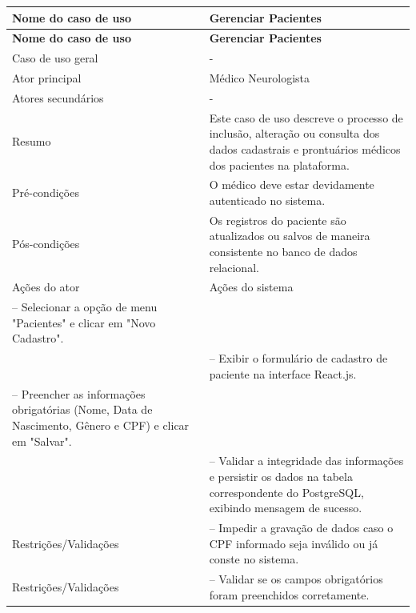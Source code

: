 \endgroup
{}
\FloatBarrier{}
\nopagebreak[4]
\begingroup
\fontsize{10}{12}\selectfont
\setlength{\tabcolsep}{3pt}
\renewcommand{\arraystretch}{1.15}
\addtocounter{table}{-1}
\begin{longtable}{|>{\raggedright\arraybackslash}p{}|>{\raggedright\arraybackslash}p{}|}
\hline
\textbf{Nome do caso de uso} & \textbf{Gerenciar Pacientes} \\ \hline
\endfirsthead
\hline
\textbf{Nome do caso de uso} & \textbf{Gerenciar Pacientes} \\ \hline
\endhead
Caso de uso geral & - \\ \hline
Ator principal & Médico Neurologista \\ \hline
Atores secundários & - \\ \hline
Resumo & Este caso de uso descreve o processo de inclusão, alteração ou consulta dos dados cadastrais e prontuários médicos dos pacientes na plataforma. \\ \hline
Pré-condições & O médico deve estar devidamente autenticado no sistema. \\ \hline
Pós-condições & Os registros do paciente são atualizados ou salvos de maneira consistente no banco de dados relacional. \\ \hline
Ações do ator & Ações do sistema \\ \hline
1 – Selecionar a opção de menu "Pacientes" e clicar em "Novo Cadastro". &  \\ \hline
 & 2 – Exibir o formulário de cadastro de paciente na interface React.js. \\ \hline
3 – Preencher as informações obrigatórias (Nome, Data de Nascimento, Gênero e CPF) e clicar em "Salvar". &  \\ \hline
 & 4 – Validar a integridade das informações e persistir os dados na tabela correspondente do PostgreSQL, exibindo mensagem de sucesso. \\ \hline
Restrições/Validações & 1 – Impedir a gravação de dados caso o CPF informado seja inválido ou já conste no sistema. \\ \hline
Restrições/Validações & 2 – Validar se os campos obrigatórios foram preenchidos corretamente. \\ \hline
\end{longtable}
\endgroup
{}
